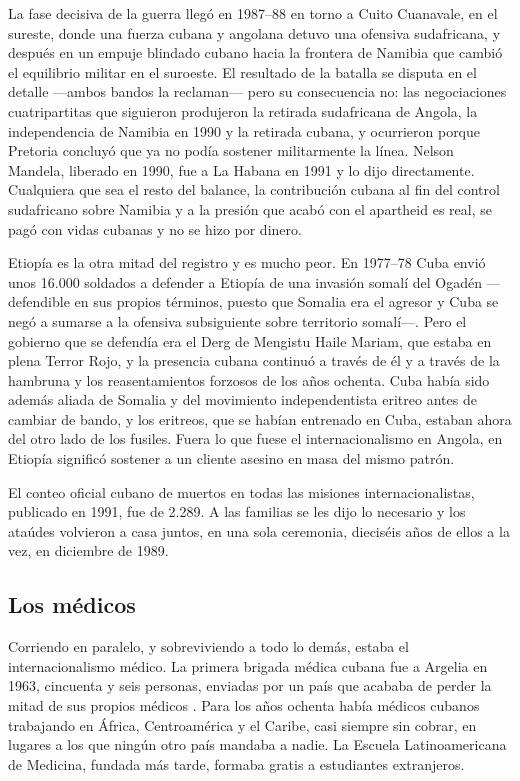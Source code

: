 La fase decisiva de la guerra llegó en 1987--88 en torno a Cuito Cuanavale, en el
sureste, donde una fuerza cubana y angolana detuvo una ofensiva sudafricana, y
después en un empuje blindado cubano hacia la frontera de Namibia que cambió el
equilibrio militar en el suroeste. El resultado de la batalla se disputa en el
detalle ---ambos bandos la reclaman--- pero su consecuencia no: las negociaciones
cuatripartitas que siguieron produjeron la retirada sudafricana de Angola, la
independencia de Namibia en 1990 y la retirada cubana, y ocurrieron porque
Pretoria concluyó que ya no podía sostener militarmente la línea. Nelson Mandela,
liberado en 1990, fue a La Habana en 1991 y lo dijo directamente. Cualquiera que
sea el resto del balance, la contribución cubana al fin del control sudafricano
sobre Namibia y a la presión que acabó con el apartheid es real, se pagó con
vidas cubanas y no se hizo por dinero.

Etiopía es la otra mitad del registro y es mucho peor. En 1977--78 Cuba envió
unos 16.000 soldados a defender a Etiopía de una invasión somalí del Ogadén
---defendible en sus propios términos, puesto que Somalia era el agresor y Cuba
se negó a sumarse a la ofensiva subsiguiente sobre territorio somalí---. Pero el
gobierno que se defendía era el Derg de Mengistu Haile Mariam, que estaba en
plena Terror Rojo, y la presencia cubana continuó a través de él y a través de la
hambruna y los reasentamientos forzosos de los años ochenta. Cuba había sido
además aliada de Somalia y del movimiento independentista eritreo antes de cambiar
de bando, y los eritreos, que se habían entrenado en Cuba, estaban ahora del otro
lado de los fusiles. Fuera lo que fuese el internacionalismo en Angola, en
Etiopía significó sostener a un cliente asesino en masa del mismo patrón.

El conteo oficial cubano de muertos en todas las misiones internacionalistas,
publicado en 1991, fue de 2.289.\unv{} A las familias se les dijo lo necesario y
los ataúdes volvieron a casa juntos, en una sola ceremonia, dieciséis años de
ellos a la vez, en diciembre de 1989.

\subsection{Los médicos}

Corriendo en paralelo, y sobreviviendo a todo lo demás, estaba el
internacionalismo médico. La primera brigada médica cubana fue a Argelia en 1963,
cincuenta y seis personas, enviadas por un país que acababa de perder la mitad de
sus propios médicos \citep{kirk2015}. Para los años ochenta había médicos cubanos
trabajando en África, Centroamérica y el Caribe, casi siempre sin cobrar, en
lugares a los que ningún otro país mandaba a nadie. La Escuela Latinoamericana de
Medicina, fundada más tarde, formaba gratis a estudiantes extranjeros.

